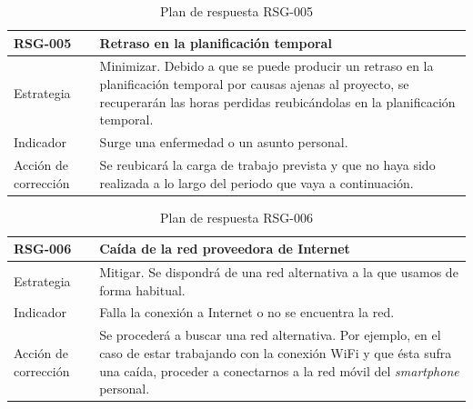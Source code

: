 \begin{table}[htpb]
\centering
\begin{tabularx}{\textwidth}{|l|X|}
\hline
\textbf{RSG-005}              & \textbf{Retraso en la planificación temporal}                                                                                                                                                     \\ \hline
Estrategia & Minimizar. Debido a que se puede producir un retraso en la planificación temporal por causas ajenas al proyecto, se recuperarán las horas perdidas reubicándolas en la planificación temporal. \\ \hline
Indicador            & Surge una enfermedad o un asunto personal.                                                                                                                                               \\ \hline
Acción de corrección & Se reubicará la carga de trabajo prevista y que no haya sido realizada a lo largo del periodo que vaya a continuación.                                                                   \\ \hline
\end{tabularx}
\caption{Plan de respuesta RSG-005}
\end{table}


\begin{table}[htpb]
\centering
\begin{tabularx}{\textwidth}{|l|X|}
\hline
\textbf{RSG-006}              & \textbf{Caída de la red proveedora de Internet}                                                                                                                                                                 \\ \hline
Estrategia & Mitigar. Se dispondrá de una red alternativa a la que usamos de forma habitual.                                                                                                                        \\ \hline
Indicador            & Falla la conexión a Internet o no se encuentra la red.                                                                                                                                                 \\ \hline
Acción de corrección & Se procederá a buscar una red alternativa. Por ejemplo, en el caso de estar trabajando con la conexión WiFi y que ésta sufra una caída, proceder a conectarnos a la red móvil del \textit{smartphone} personal. \\ \hline
\end{tabularx}
\caption{Plan de respuesta RSG-006}
\end{table}


